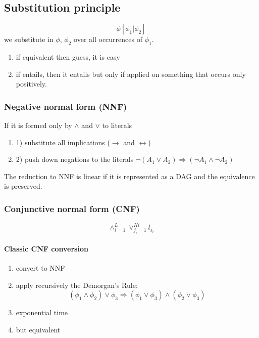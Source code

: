 \documentclass[11pt]{article}
\begin{document}
\subsection{Substitution principle} %
\label{sub:substitution_principle}
\[
	\phi[\phi _1 | \phi _2]	
\]
we substitute in $\phi$, $\phi _2$ over all occurrences of $\phi _1$.\\
\begin{enumerate}
	\item if equivalent then guess, it is easy
	\item if entails, then it entails but only if applied on something that occurs only positively.
\end{enumerate}


\subsubsection{Negative normal form (NNF)} %
\label{ssub:subsubsection_name}
If it is formed only by $\land$ and $\lor$ to literals
\begin{enumerate}
	\item 1) substitute all implications ($\rightarrow$ and $\leftrightarrow$)
	\item 2) push down negations to the literals $\lnot(A_1 \lor A_2) \Rightarrow (\lnot A_1 \land \lnot A_2)$
\end{enumerate}

The reduction to NNF is linear if it is represented as a DAG and the equivalence is preserved.


\subsubsection{Conjunctive normal form (CNF)} %
\label{ssub:cnf}
\[
	\land^{L}_{i=1}\lor^{Ki}_{j_i=1} l_{j_i}
\]

\paragraph{Classic CNF conversion} %
\label{par:classic_cnf_conversion}
\begin{enumerate}
	\item convert to NNF
	\item apply recursively the Demorgan's Rule: \[
		(\phi _1 \land \phi _2 )\lor \phi _3 \Rightarrow (\phi _1 \lor \phi _3) \land (\phi _2 \lor \phi _3)
	\]
	\item exponential time
	\item but equivalent
\end{enumerate}
\end{document}
